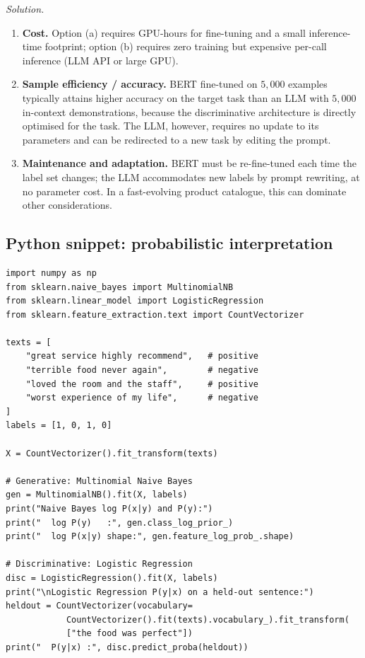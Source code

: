 \documentclass[12pt,a4paper]{report}
\theoremstyle{definition}
\theoremstyle{remark}
\begin{document}
\textit{Solution.}
\begin{enumerate}
    \item \textbf{Cost.} Option (a) requires GPU-hours for fine-tuning and a small inference-time footprint; option (b) requires zero training but expensive per-call inference (LLM API or large GPU).
    \item \textbf{Sample efficiency / accuracy.} BERT fine-tuned on $5{,}000$ examples typically attains higher accuracy on the target task than an LLM with $5{,}000$ in-context demonstrations, because the discriminative architecture is directly optimised for the task. The LLM, however, requires no update to its parameters and can be redirected to a new task by editing the prompt.
    \item \textbf{Maintenance and adaptation.} BERT must be re-fine-tuned each time the label set changes; the LLM accommodates new labels by prompt rewriting, at no parameter cost. In a fast-evolving product catalogue, this can dominate other considerations.
\end{enumerate}

\subsection{Python snippet: probabilistic interpretation}

\begin{lstlisting}
import numpy as np
from sklearn.naive_bayes import MultinomialNB
from sklearn.linear_model import LogisticRegression
from sklearn.feature_extraction.text import CountVectorizer

texts = [
    "great service highly recommend",   # positive
    "terrible food never again",        # negative
    "loved the room and the staff",     # positive
    "worst experience of my life",      # negative
]
labels = [1, 0, 1, 0]

X = CountVectorizer().fit_transform(texts)

# Generative: Multinomial Naive Bayes
gen = MultinomialNB().fit(X, labels)
print("Naive Bayes log P(x|y) and P(y):")
print("  log P(y)   :", gen.class_log_prior_)
print("  log P(x|y) shape:", gen.feature_log_prob_.shape)

# Discriminative: Logistic Regression
disc = LogisticRegression().fit(X, labels)
print("\nLogistic Regression P(y|x) on a held-out sentence:")
heldout = CountVectorizer(vocabulary=
            CountVectorizer().fit(texts).vocabulary_).fit_transform(
            ["the food was perfect"])
print("  P(y|x) :", disc.predict_proba(heldout))
\end{lstlisting}
\end{document}
